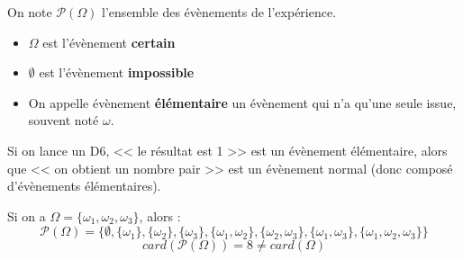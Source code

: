 \begin{definition}
    On note $\mathcal{P}(\Omega)$ l'ensemble des évènements de l'expérience.
\end{definition}

\begin{definition}
    \begin{itemize}
        \item $\Omega$ est l'évènement \textbf{certain}
        \item $\emptyset$ est l'évènement \textbf{impossible}
        \item On appelle évènement \textbf{élémentaire} un évènement qui n'a qu'une seule issue, souvent noté $\omega$.
    \end{itemize}
\end{definition}

\begin{example}
    Si on lance un D6, << le résultat est 1 >> est un évènement élémentaire, alors que << on obtient un nombre pair >> est un évènement normal (donc composé d'évènements élémentaires).
\end{example}

\begin{example}
    Si on a $\Omega = \{\omega_1,\omega_2,\omega_3\}$, alors :
    \begin{equation*}
        \mathcal{P}(\Omega) = \{ \emptyset,\{\omega_1\},\{\omega_2\},\{\omega_3\},\{\omega_1,\omega_2\},\{\omega_2,\omega_3\},\{\omega_1,\omega_3\},\{\omega_1,\omega_2,\omega_3\} \}
    \end{equation*}
    \begin{equation*}
        card(\mathcal{P}(\Omega)) = 8 \neq card(\Omega)
    \end{equation*}
\end{example}